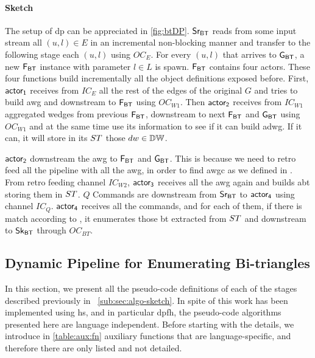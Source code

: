 \paragraph{Sketch} The setup of \acrshort{dp} can be appreciated in \autoref{fig:btDP}. $\mathsf{Sr_{BT}}$ reads from some input stream all $(u,l) \in E$ in an incremental non-blocking manner and transfer to the following stage each $(u,l)$ using $OC_E$.
For every $(u,l)$ that arrives to $\mathsf{G_{BT}}$, a new $\mathsf{F_{BT}}$ instance with parameter $l \in L$ is spawn. $\mathsf{F_{BT}}$ contains four actors. These four functions build incrementally all the object definitions exposed before. 
First, $\mathsf{actor_1}$ receives from $IC_E$ all the rest of the edges of the original $G$ and tries to build \acrshort{awg} and downstream to $\mathsf{F_{BT}}$ using $OC_{W1}$. 
Then $\mathsf{actor_2}$ receives from $IC_{W1}$ aggregated wedges from previous $\mathsf{F_{BT}}$, downstream to next $\mathsf{F_{BT}}$ and $\mathsf{G_{BT}}$ using $OC_{W1}$ and at the same time use its information to see 
if it can build \acrshort{adwg}. If it can, it will store in its $ST$ those $dw \in \mathbb{DW}$.

$\mathsf{actor_2}$ downstream the \acrshort{awg} to  $\mathsf{F_{BT}}$ and $\mathsf{G_{BT}}$. This is because we need to retro feed all the pipeline with all the \acrshort{awg}, in order to find \acrshort{awgc} as we defined in .
From retro feeding channel $IC_{W2}$, $\mathsf{actor_3}$ receives all the \acrshort{awg} again and builds \acrshort{abt} storing them in $ST$. 
$Q$ Commands are downstream from $\mathsf{Sr_{BT}}$ to $\mathsf{actor_4}$ using channel $IC_Q$. $\mathsf{actor_4}$ receives all the commands, and for each of them, if there is match according to , it enumerates those \acrshort{bt} extracted from $ST$ and downstream to $\mathsf{Sk_{BT}}$ through $OC_{BT}$.

\subsection{Dynamic Pipeline for Enumerating Bi-triangles}
In this section, we present all the pseudo-code definitions of each of the stages described previously in ~\autoref{sub:sec:algo-sketch}. 
In spite of this work has been implemented using \acrshort{hs}, and in particular \acrshort{dpfh}, the pseudo-code algorithms presented here are language independent.
Before starting with the details, we introduce in \autoref{table:aux:fn} auxiliary functions that are language-specific, and therefore there are only listed and not detailed.

